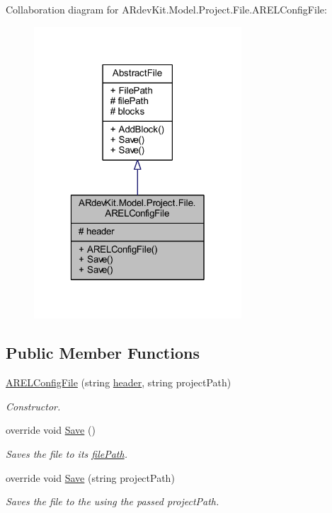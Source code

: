 Collaboration diagram for A\-Rdev\-Kit.\-Model.\-Project.\-File.\-A\-R\-E\-L\-Config\-File\-:
\nopagebreak
\begin{figure}[H]
\begin{center}
\leavevmode
\includegraphics[width=220pt]{class_a_rdev_kit_1_1_model_1_1_project_1_1_file_1_1_a_r_e_l_config_file__coll__graph}
\end{center}
\end{figure}
\subsection*{Public Member Functions}
\begin{DoxyCompactItemize}
\item 
\hyperlink{class_a_rdev_kit_1_1_model_1_1_project_1_1_file_1_1_a_r_e_l_config_file_a740b9f9e195108cf418fff752545a88a}{A\-R\-E\-L\-Config\-File} (string \hyperlink{class_a_rdev_kit_1_1_model_1_1_project_1_1_file_1_1_a_r_e_l_config_file_a293887e7bfa91e75acfc21791106dc67}{header}, string project\-Path)
\begin{DoxyCompactList}\small\item\em Constructor. \end{DoxyCompactList}\item 
override void \hyperlink{class_a_rdev_kit_1_1_model_1_1_project_1_1_file_1_1_a_r_e_l_config_file_a65bf5e667cb70e7cb9ae9a735ebba97f}{Save} ()
\begin{DoxyCompactList}\small\item\em Saves the file to its \hyperlink{class_a_rdev_kit_1_1_model_1_1_project_1_1_file_1_1_abstract_file_ad879e3a81860da8b72f2d9f61a18ab3b}{file\-Path}. \end{DoxyCompactList}\item 
override void \hyperlink{class_a_rdev_kit_1_1_model_1_1_project_1_1_file_1_1_a_r_e_l_config_file_af0f2e70451d0dda0984dd186fcb6afde}{Save} (string project\-Path)
\begin{DoxyCompactList}\small\item\em Saves the file to the using the passed project\-Path. \end{DoxyCompactList}\end{DoxyCompactItemize}
